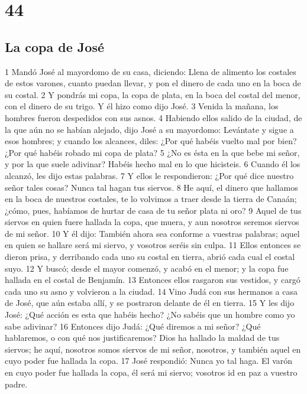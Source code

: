 \chapter{44}

\section*{La copa de José}

1 Mandó José al mayordomo de su casa, diciendo: Llena de alimento los costales de estos varones, cuanto puedan llevar, y pon el dinero de cada uno en la boca de su costal.
2 Y pondrás mi copa, la copa de plata, en la boca del costal del menor, con el dinero de su trigo. Y él hizo como dijo José.
3 Venida la mañana, los hombres fueron despedidos con sus asnos.
4 Habiendo ellos salido de la ciudad, de la que aún no se habían alejado, dijo José a su mayordomo: Levántate y sigue a esos hombres; y cuando los alcances, diles: ¿Por qué habéis vuelto mal por bien? ¿Por qué habéis robado mi copa de plata?
5 ¿No es ésta en la que bebe mi señor, y por la que suele adivinar? Habéis hecho mal en lo que hicisteis.
6 Cuando él los alcanzó, les dijo estas palabras.
7 Y ellos le respondieron: ¿Por qué dice nuestro señor tales cosas? Nunca tal hagan tus siervos.
8 He aquí, el dinero que hallamos en la boca de nuestros costales, te lo volvimos a traer desde la tierra de Canaán; ¿cómo, pues, habíamos de hurtar de casa de tu señor plata ni oro?
9 Aquel de tus siervos en quien fuere hallada la copa, que muera, y aun nosotros seremos siervos de mi señor.
10 Y él dijo: También ahora sea conforme a vuestras palabras; aquel en quien se hallare será mi siervo, y vosotros seréis sin culpa.
11 Ellos entonces se dieron prisa, y derribando cada uno su costal en tierra, abrió cada cual el costal suyo.
12 Y buscó; desde el mayor comenzó, y acabó en el menor; y la copa fue hallada en el costal de Benjamín.
13 Entonces ellos rasgaron sus vestidos, y cargó cada uno su asno y volvieron a la ciudad.
14 Vino Judá con sus hermanos a casa de José, que aún estaba allí, y se postraron delante de él en tierra.
15 Y les dijo José: ¿Qué acción es esta que habéis hecho? ¿No sabéis que un hombre como yo sabe adivinar?
16 Entonces dijo Judá: ¿Qué diremos a mi señor? ¿Qué hablaremos, o con qué nos justificaremos? Dios ha hallado la maldad de tus siervos; he aquí, nosotros somos siervos de mi señor, nosotros, y también aquel en cuyo poder fue hallada la copa.
17 José respondió: Nunca yo tal haga. El varón en cuyo poder fue hallada la copa, él será mi siervo; vosotros id en paz a vuestro padre.

